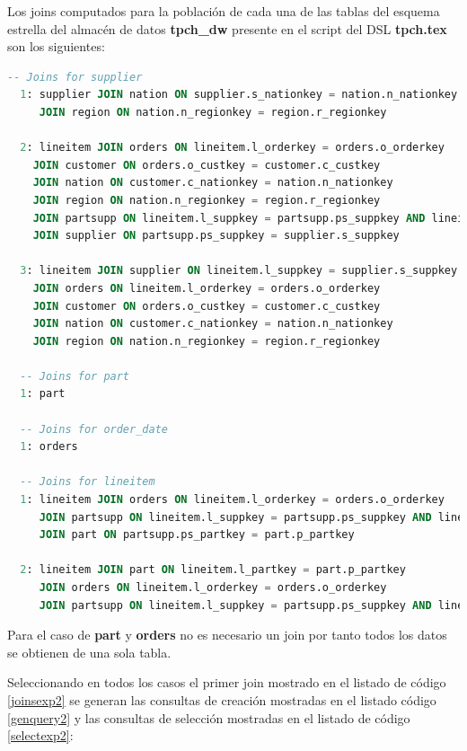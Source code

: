 Los joins computados para la poblaci\'on de cada una de las tablas del esquema estrella del almacén de datos 
\textbf{tpch\_dw} presente en el script del DSL \textbf{tpch.tex} son los siguientes: 

\begin{lstlisting}[label={joinsexp2}, caption={Joins computados para el experimento 2}, language={sql}]
  -- Joins for supplier
  1: supplier JOIN nation ON supplier.s_nationkey = nation.n_nationkey 
     JOIN region ON nation.n_regionkey = region.r_regionkey

  2: lineitem JOIN orders ON lineitem.l_orderkey = orders.o_orderkey 
    JOIN customer ON orders.o_custkey = customer.c_custkey 
    JOIN nation ON customer.c_nationkey = nation.n_nationkey 
    JOIN region ON nation.n_regionkey = region.r_regionkey 
    JOIN partsupp ON lineitem.l_suppkey = partsupp.ps_suppkey AND lineitem.l_partkey = partsupp.ps_partkey 
    JOIN supplier ON partsupp.ps_suppkey = supplier.s_suppkey

  3: lineitem JOIN supplier ON lineitem.l_suppkey = supplier.s_suppkey 
    JOIN orders ON lineitem.l_orderkey = orders.o_orderkey 
    JOIN customer ON orders.o_custkey = customer.c_custkey 
    JOIN nation ON customer.c_nationkey = nation.n_nationkey 
    JOIN region ON nation.n_regionkey = region.r_regionkey

  -- Joins for part
  1: part

  -- Joins for order_date
  1: orders

  -- Joins for lineitem
  1: lineitem JOIN orders ON lineitem.l_orderkey = orders.o_orderkey 
     JOIN partsupp ON lineitem.l_suppkey = partsupp.ps_suppkey AND lineitem.l_partkey = partsupp.ps_partkey 
     JOIN part ON partsupp.ps_partkey = part.p_partkey

  2: lineitem JOIN part ON lineitem.l_partkey = part.p_partkey 
     JOIN orders ON lineitem.l_orderkey = orders.o_orderkey 
     JOIN partsupp ON lineitem.l_suppkey = partsupp.ps_suppkey AND lineitem.l_partkey = partsupp.ps_partkey
\end{lstlisting}

Para el caso de \textbf{part} y \textbf{orders} no es necesario un join por tanto todos los datos se obtienen de 
una sola tabla. 

Seleccionando en todos los casos el primer join mostrado en el listado de c\'odigo \ref{joinsexp2} se generan 
las consultas de creaci\'on mostradas en el listado c\'odigo \ref{genquery2} y las consultas de selecci\'on 
mostradas en el listado de c\'odigo \ref{selectexp2}: 

